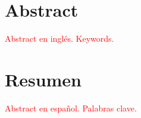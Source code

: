 \thispagestyle{plain}


\vspace{-30pt}
\section*{Abstract}

\textcolor{red}{Abstract en inglés. Keywords.}

\section*{Resumen}

\textcolor{red}{Abstract en español. Palabras clave.}

\newpage
\thispagestyle{empty}

